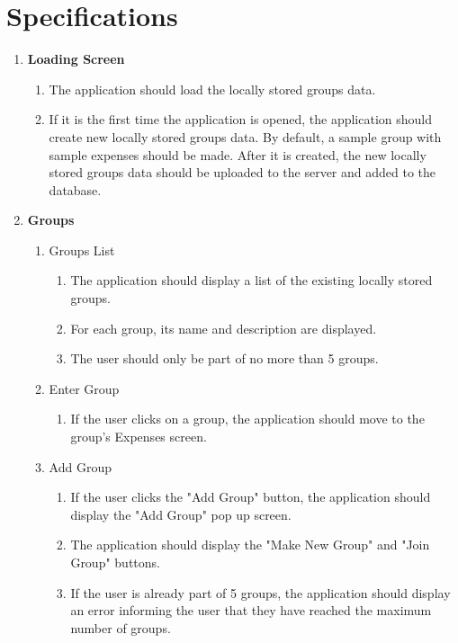 \documentclass[conference]{IEEEtran}
\begin{document}
\section{Specifications}
    \begin{enumerate}
        \item \textbf{Loading Screen}
            \begin{enumerate}
                \item The application should load the locally stored groups data.
                \item If it is the first time the application is opened, the application should create new locally stored groups data. By default, a sample group with sample expenses should be made. After it is created, the new locally stored groups data should be uploaded to the server and added to the database.
            \end{enumerate}
        \item \textbf{Groups}
            \begin{enumerate}
                \item Groups List
                    \begin{enumerate}
                        \item The application should display a list of the existing locally stored groups.
                        \item For each group, its name and description are displayed.
                        \item The user should only be part of no more than 5 groups.
                    \end{enumerate}
                \item Enter Group
                    \begin{enumerate}
                        \item If the user clicks on a group, the application should move to the group's Expenses screen.
                    \end{enumerate}
                \item Add Group
                    \begin{enumerate}
                        \item If the user clicks the "Add Group" button, the application should display the "Add Group" pop up screen.
                        \item The application should display the "Make New Group" and "Join Group" buttons.
                        \item If the user is already part of 5 groups, the application should display an error informing the user that they have reached the maximum number of groups.

\end{enumerate}
\end{enumerate}
\end{enumerate}
\end{document}
